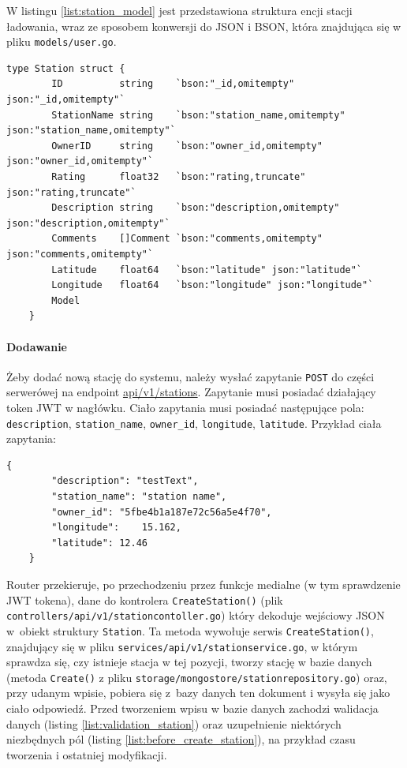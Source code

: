 W listingu \ref{list:station_model} jest przedstawiona struktura encji stacji ładowania, wraz ze sposobem konwersji do JSON i BSON, która znajdująca się w pliku \texttt{models/user.go}.
\begin{lstlisting}[label=list:station_model,caption=Model danych stacji ładowania.,basicstyle=\tiny\ttfamily]
    type Station struct {
        ID          string    `bson:"_id,omitempty" json:"_id,omitempty"`
        StationName string    `bson:"station_name,omitempty" json:"station_name,omitempty"`
        OwnerID     string    `bson:"owner_id,omitempty" json:"owner_id,omitempty"`
        Rating      float32   `bson:"rating,truncate" json:"rating,truncate"`
        Description string    `bson:"description,omitempty" json:"description,omitempty"`
        Comments    []Comment `bson:"comments,omitempty" json:"comments,omitempty"`
        Latitude    float64   `bson:"latitude" json:"latitude"`
        Longitude   float64   `bson:"longitude" json:"longitude"`
        Model
    }
\end{lstlisting}

\paragraph{Dodawanie\newline}
Żeby dodać nową stację do systemu, należy wysłać zapytanie \texttt{POST} do części serwerówej na endpoint \url{api/v1/stations}. Zapytanie musi posiadać działający token JWT w nagłówku. Ciało zapytania musi posiadać następujące pola: \texttt{description}, \texttt{station\_name}, \texttt{owner\_id}, \texttt{longitude}, \texttt{latitude}.
Przykład ciała zapytania:
\begin{lstlisting}[basicstyle=\tiny\ttfamily]
    {
		"description": "testText",
		"station_name": "station name",
		"owner_id": "5fbe4b1a187e72c56a5e4f70",
		"longitude":    15.162,
		"latitude": 12.46
    }
\end{lstlisting}

Router przekieruje, po przechodzeniu przez funkcje medialne (w tym sprawdzenie JWT tokena), dane do kontrolera \texttt{CreateStation()} (plik \texttt{controllers/api/v1/stationcontoller.go}) który dekoduje wejściowy JSON w~obiekt struktury \texttt{Station}.
Ta metoda wywołuje serwis \texttt{CreateStation()}, znajdujący się w pliku \texttt{services/api/v1/stationservice.go}, w którym sprawdza się, czy istnieje stacja w tej pozycji, tworzy stację w bazie danych (metoda \texttt{Create()} z pliku \texttt{storage/mongostore/stationrepository.go}) oraz, przy udanym wpisie, pobiera się z~bazy danych ten dokument i wysyła się jako ciało odpowiedź.
Przed tworzeniem wpisu w bazie danych zachodzi walidacja danych (listing \ref{list:validation_station}) oraz uzupełnienie niektórych niezbędnych pól (listing \ref{list:before_create_station}), na przykład czasu tworzenia i ostatniej modyfikacji.

